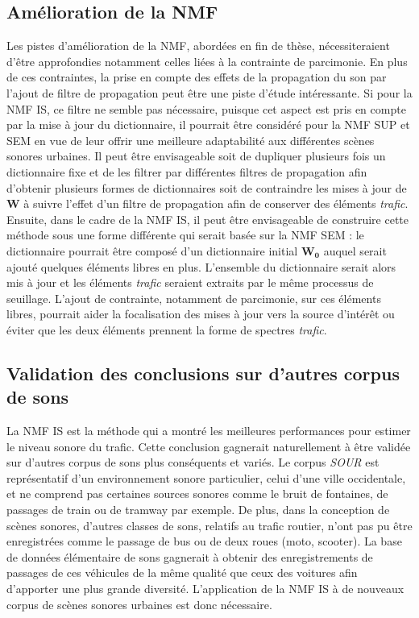 \subsection*{Amélioration de la NMF}

Les pistes d'amélioration de la NMF, abordées en fin de thèse, nécessiteraient d'être approfondies notamment celles liées à la contrainte de parcimonie.
En plus de ces contraintes, la prise en compte des effets de la propagation du son par l'ajout de filtre de propagation peut être une piste d'étude intéressante. Si pour la NMF IS, ce filtre ne semble pas nécessaire, puisque cet aspect est pris en compte par la mise à jour du dictionnaire, il pourrait être considéré pour la NMF SUP et SEM en vue de leur offrir une meilleure adaptabilité aux différentes scènes sonores urbaines. Il peut être envisageable soit de dupliquer plusieurs fois un dictionnaire fixe et de les filtrer par différentes filtres de propagation afin d'obtenir plusieurs formes de dictionnaires soit de contraindre les mises à jour de $\mathbf{W}$ à suivre l'effet d'un filtre de propagation afin de conserver des éléments \textit{trafic}.
Ensuite, dans le cadre de la NMF IS, il peut être envisageable de construire cette méthode sous une forme différente qui serait basée sur la NMF SEM : le dictionnaire pourrait être composé d'un dictionnaire initial $\mathbf{W_0}$ auquel serait ajouté quelques éléments libres en plus. L'ensemble du dictionnaire serait alors mis à jour et les éléments \textit{trafic} seraient extraits par le même processus de seuillage. L'ajout de contrainte, notamment de parcimonie, sur ces éléments libres, pourrait aider la focalisation des mises à jour vers la source d'intérêt ou éviter que les deux éléments prennent la forme de spectres \textit{trafic}.

\subsection*{Validation des conclusions sur d'autres corpus de sons}
La NMF IS  est la méthode qui a montré les meilleures performances pour estimer le niveau sonore du trafic.  Cette conclusion gagnerait naturellement à être validée sur d'autres corpus de sons plus conséquents et variés. Le corpus \textit{SOUR} est représentatif d'un environnement sonore particulier, celui d'une ville occidentale, et ne comprend pas certaines sources sonores comme le bruit de fontaines, de passages de train ou de tramway par exemple. De plus, dans la conception de scènes sonores, d'autres classes de sons, relatifs au trafic routier, n'ont pas pu être enregistrées comme le passage de bus ou de deux roues (moto, scooter). La base de données élémentaire de sons gagnerait à obtenir des enregistrements de passages de ces véhicules de la même qualité que ceux des voitures afin d'apporter une plus grande diversité. L'application de la NMF IS à de nouveaux corpus de scènes sonores urbaines est donc nécessaire.

